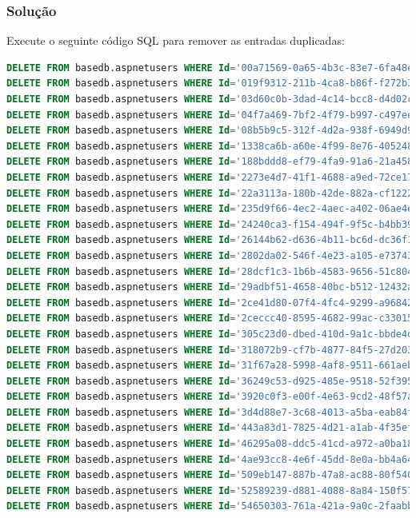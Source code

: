 \documentclass[12pt]{article}
\begin{document}
\subsubsection{Solução}
Execute o seguinte código SQL para remover as entradas duplicadas:
\begin{lstlisting}[language=SQL]
DELETE FROM basedb.aspnetusers WHERE Id='00a71569-0a65-4b3c-83e7-6fa48e6f9a92';
DELETE FROM basedb.aspnetusers WHERE Id='019f9312-211b-4ca8-b86f-f272b3e7459c';
DELETE FROM basedb.aspnetusers WHERE Id='03d60c0b-3dad-4c14-bcc8-d4d02c35933d';
DELETE FROM basedb.aspnetusers WHERE Id='04f7a469-7bf2-4f79-b997-c497eebe07c9';
DELETE FROM basedb.aspnetusers WHERE Id='08b5b9c5-312f-4d2a-938f-6949d9771d84';
DELETE FROM basedb.aspnetusers WHERE Id='1338ca6b-a60e-4f99-8e76-4052485f553e';
DELETE FROM basedb.aspnetusers WHERE Id='188bddd8-ef79-4fa9-91a6-21a458297edd';
DELETE FROM basedb.aspnetusers WHERE Id='2273e4d7-41f1-4688-a9ed-72ce17210d0c';
DELETE FROM basedb.aspnetusers WHERE Id='22a3113a-180b-42de-882a-cf12221a8842';
DELETE FROM basedb.aspnetusers WHERE Id='235d9f66-4ec2-4aec-a402-06ae4e5eb5e7';
DELETE FROM basedb.aspnetusers WHERE Id='24240ca3-f154-494f-9f5c-b4bb39591aca';
DELETE FROM basedb.aspnetusers WHERE Id='26144b62-d636-4b11-bc6d-dc36f165224e';
DELETE FROM basedb.aspnetusers WHERE Id='2802da02-546f-4e23-a105-e7374359509e';
DELETE FROM basedb.aspnetusers WHERE Id='28dcf1c3-1b6b-4583-9656-51c8048a1fe1';
DELETE FROM basedb.aspnetusers WHERE Id='29adbf51-4658-40bc-b512-12432ab55b9e';
DELETE FROM basedb.aspnetusers WHERE Id='2ce41d80-07f4-4fc4-9299-a968422a1e5b';
DELETE FROM basedb.aspnetusers WHERE Id='2ceccc40-8595-4682-99ac-c330157ef1c0';
DELETE FROM basedb.aspnetusers WHERE Id='305c23d0-dbed-410d-9a1c-bbde4d5f40b6';
DELETE FROM basedb.aspnetusers WHERE Id='318072b9-cf7b-4877-84f5-27d2031528ea';
DELETE FROM basedb.aspnetusers WHERE Id='31f67a28-5998-4af8-9511-661aeb7627df';
DELETE FROM basedb.aspnetusers WHERE Id='36249c53-d925-485e-9518-52f395b0d4bb';
DELETE FROM basedb.aspnetusers WHERE Id='3920c0f3-e00f-4e63-9cd2-48f57ae69048';
DELETE FROM basedb.aspnetusers WHERE Id='3d4d88e7-3c68-4013-a5ba-eab84ff0b31a';
DELETE FROM basedb.aspnetusers WHERE Id='443a83d1-7825-4d21-a1ab-4f35eff72d10';
DELETE FROM basedb.aspnetusers WHERE Id='46295a08-ddc5-41cd-a972-a0ba180c24bb';
DELETE FROM basedb.aspnetusers WHERE Id='4ae93cc8-4e6f-45dd-8e0a-bb4a645f638a';
DELETE FROM basedb.aspnetusers WHERE Id='509eb147-887b-47a8-ac88-80f540c18622';
DELETE FROM basedb.aspnetusers WHERE Id='52589239-d881-4088-8a84-150f5775d034';
DELETE FROM basedb.aspnetusers WHERE Id='54650303-761a-421a-9a0c-2faabbe4c718';

\end{lstlisting}
\end{document}
